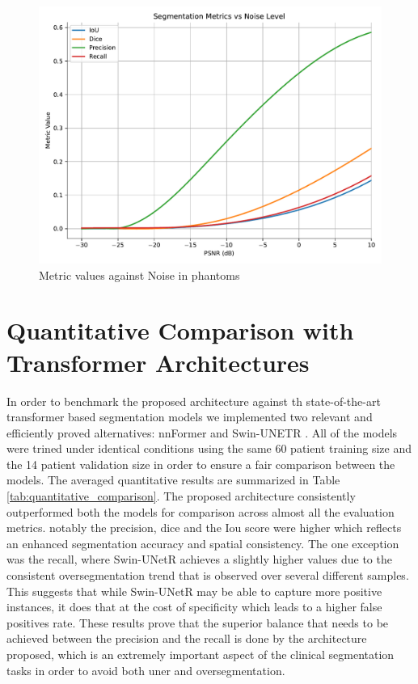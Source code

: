 \begin{figure}[htb!]  %
    \centering
	\centering
	\includegraphics[width=1\textwidth]{images/metrics_vs_noise_cubic.pdf}
	\caption{\centering Metric values against Noise in phantoms}
	\label{Fig:noise}
\end{figure}

\section{Quantitative Comparison with Transformer Architectures}
In order to benchmark the proposed architecture against th state-of-the-art transformer based segmentation models we implemented two relevant and efficiently proved alternatives: nnFormer \cite{zhou2023nnformer} and Swin-UNETR \cite{10.1007/978-3-031-08999-2_22}. All of the models were trined under identical conditions using the same 60 patient training size and the 14 patient validation size in order to ensure a fair comparison between the models. The averaged quantitative results are summarized in Table \ref{tab:quantitative_comparison}. The proposed architecture consistently outperformed both the models for comparison across almost all the evaluation metrics. notably the precision, dice and the Iou score were higher which reflects an enhanced segmentation accuracy and spatial consistency. The one exception was the recall, where Swin-UNetR achieves a slightly higher values due to the consistent oversegmentation trend that is observed over several different samples. This suggests that while Swin-UNetR may be able to capture more positive instances, it does that at the cost of specificity which leads to a higher false positives rate. These results prove that the superior balance that needs to be achieved between the precision and the recall is done by the architecture proposed, which is an extremely important aspect of the clinical segmentation tasks in order to avoid both uner and oversegmentation.

